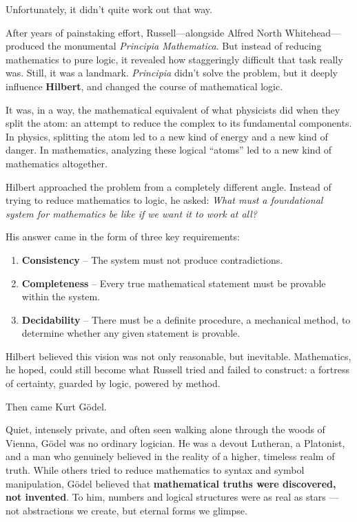 Unfortunately, it didn’t quite work out that way.

After years of painstaking effort, Russell---alongside Alfred North Whitehead---produced the monumental \textit{Principia Mathematica}. But instead of reducing mathematics to pure logic, it revealed how staggeringly difficult that task really was. Still, it was a landmark. \textit{Principia} didn’t solve the problem, but it deeply influence \textbf{Hilbert}, and changed the course of mathematical logic.

It was, in a way, the mathematical equivalent of what physicists did when they split the atom: an attempt to reduce the complex to its fundamental components. In physics, splitting the atom led to a new kind of energy and a new kind of danger. In mathematics, analyzing these logical ``atoms'' led to a new kind of mathematics altogether.

Hilbert approached the problem from a completely different angle. Instead of trying to reduce mathematics to logic, he asked: \textit{What must a foundational system for mathematics be like if we want it to work at all?}

His answer came in the form of three key requirements:

\begin{enumerate}
    \item \textbf{Consistency} – The system must not produce contradictions.
    \item \textbf{Completeness} – Every true mathematical statement must be provable within the system.
    \item \textbf{Decidability} – There must be a definite procedure, a mechanical method, to determine whether any given statement is provable.
\end{enumerate}

Hilbert believed this vision was not only reasonable, but inevitable. Mathematics, he hoped, could still become what Russell tried and failed to construct: a fortress of certainty, guarded by logic, powered by method.

\bigskip
\noindent
Then came Kurt Gödel.

Quiet, intensely private, and often seen walking alone through the woods of Vienna, Gödel was no ordinary logician. He was a devout Lutheran, a Platonist, and a man who genuinely believed in the reality of a higher, timeless realm of truth. While others tried to reduce mathematics to syntax and symbol manipulation, Gödel believed that \textbf{mathematical truths were discovered, not invented}. To him, numbers and logical structures were as real as stars — not abstractions we create, but eternal forms we glimpse.

